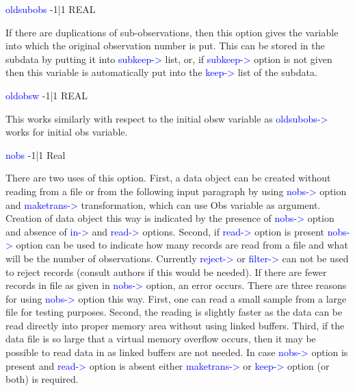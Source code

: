 \vspace{0.3cm}
\hline
\vspace{0.3cm}
\noindent \textcolor{blue}{oldsubobs} \tabto{3cm} -1|1 \tabto{5cm}   REAL \tabto{7cm}
\begin{changemargin}{3cm}{0cm}
\noindent  If there are duplications of sub-observations, then this option gives the variable
into which the original observation number is put. This can be stored in the
subdata by putting it into \textcolor{blue}{subkeep->} list, or, if \textcolor{blue}{subkeep->} option is not given
then this variable is automatically put into the \textcolor{blue}{keep->} list of the subdata.
\end{changemargin}
\vspace{0.3cm}
\hline
\vspace{0.3cm}
\noindent \textcolor{blue}{oldobsw} \tabto{3cm} -1|1 \tabto{5cm}  REAL \tabto{7cm}
\begin{changemargin}{3cm}{0cm}
\noindent  This works similarly with respect to the initial obsw variable as \textcolor{blue}{oldsubobs->}
works for initial obs variable.
\end{changemargin}
\vspace{0.3cm}
\hline
\vspace{0.3cm}
\noindent \textcolor{blue}{nobs} \tabto{3cm} -1|1 \tabto{5cm}  Real \tabto{7cm}
\begin{changemargin}{3cm}{0cm}
\noindent  There are two uses of this option. First, a data object can be created without reading
from a file or from the following input paragraph by using \textcolor{blue}{nobs->} option and
\textcolor{blue}{maketrans->} transformation, which can use Obs variable as argument. Creation
of data object this way is indicated by the presence of \textcolor{blue}{nobs->} option and absence
of \textcolor{blue}{in->} and \textcolor{blue}{read->} options. Second, if \textcolor{blue}{read->} option is present \textcolor{blue}{nobs->}
option can be used to indicate how many records are read from a file and what
will be the number of observations. Currently \textcolor{blue}{reject->} or \textcolor{blue}{filter->} can not
be used to reject records (consult authors if this would be needed). If there are
fewer records in file as given in \textcolor{blue}{nobs->} option, an error occurs. There are three
reasons for using \textcolor{blue}{nobs->} option this way. First, one can read a small sample
from a large file for testing purposes. Second, the reading is slightly faster as the
data can be read directly into proper memory area without using linked buffers.
Third, if the data file is so large that a virtual memory overflow occurs, then it may
be possible to read data in as linked buffers are not needed.
In case \textcolor{blue}{nobs->} option is present and \textcolor{blue}{read->} option is absent either
\textcolor{blue}{maketrans->} or \textcolor{blue}{keep->} option (or both) is required.
\end{changemargin}
